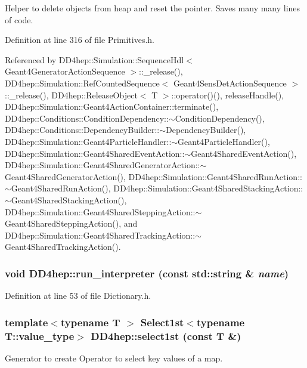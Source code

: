 Helper to delete objects from heap and reset the pointer. Saves many many lines of code. 

Definition at line 316 of file Primitives.h.

Referenced by DD4hep::Simulation::SequenceHdl$<$ Geant4GeneratorActionSequence $>$::\_\-release(), DD4hep::Simulation::RefCountedSequence$<$ Geant4SensDetActionSequence $>$::\_\-release(), DD4hep::ReleaseObject$<$ T $>$::operator()(), releaseHandle(), DD4hep::Simulation::Geant4ActionContainer::terminate(), DD4hep::Conditions::ConditionDependency::$\sim$ConditionDependency(), DD4hep::Conditions::DependencyBuilder::$\sim$DependencyBuilder(), DD4hep::Simulation::Geant4ParticleHandler::$\sim$Geant4ParticleHandler(), DD4hep::Simulation::Geant4SharedEventAction::$\sim$Geant4SharedEventAction(), DD4hep::Simulation::Geant4SharedGeneratorAction::$\sim$Geant4SharedGeneratorAction(), DD4hep::Simulation::Geant4SharedRunAction::$\sim$Geant4SharedRunAction(), DD4hep::Simulation::Geant4SharedStackingAction::$\sim$Geant4SharedStackingAction(), DD4hep::Simulation::Geant4SharedSteppingAction::$\sim$Geant4SharedSteppingAction(), and DD4hep::Simulation::Geant4SharedTrackingAction::$\sim$Geant4SharedTrackingAction().\hypertarget{namespace_d_d4hep_ab5d6e765a0aca826a176a6e221d416b4}{
\subsubsection[{run\_\-interpreter}]{\setlength{\rightskip}{0pt plus 5cm}void DD4hep::run\_\-interpreter (const std::string \& {\em name})}}
\label{namespace_d_d4hep_ab5d6e765a0aca826a176a6e221d416b4}


Definition at line 53 of file Dictionary.h.\hypertarget{namespace_d_d4hep_a356dc9dc533d859f74bd2d5816e39357}{
\subsubsection[{select1st}]{\setlength{\rightskip}{0pt plus 5cm}template$<$typename T $>$ {\bf Select1st}$<$typename T::value\_\-type$>$ DD4hep::select1st (const {\bf T} \&)}}
\label{namespace_d_d4hep_a356dc9dc533d859f74bd2d5816e39357}


Generator to create Operator to select key values of a map. 

